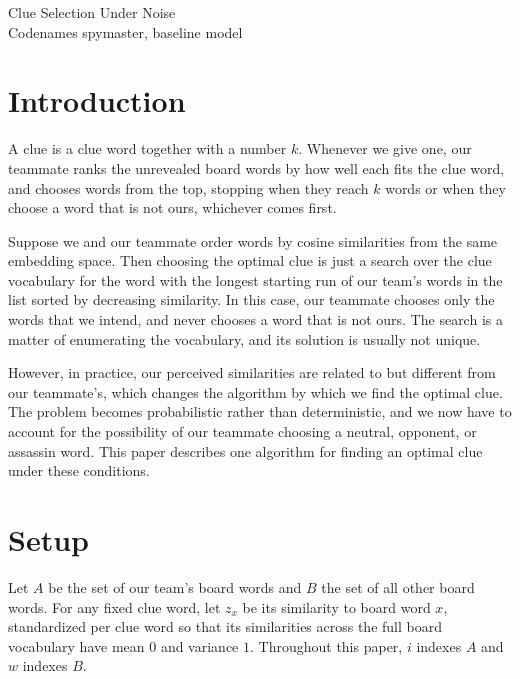 \documentclass[12pt]{article}
\begin{document}
\begin{center}
  {\LARGE Clue Selection Under Noise}\\[0.7em]
  Codenames spymaster, baseline model
\end{center}
\vspace{1.5em}

\section{Introduction}
\label{sec:intro}

A clue is a clue word together with a number $k$. Whenever we give one, our
teammate ranks the unrevealed board words by how well each fits the clue word,
and chooses words from the top, stopping when they reach $k$ words or when
they choose a word that is not ours, whichever comes first.

Suppose we and our teammate order words by cosine similarities from the same
embedding space. Then choosing the optimal clue is just a search over the clue
vocabulary for the word with the longest starting run of our team's words in
the list sorted by decreasing similarity. In this case, our teammate chooses
only the words that we intend, and never chooses a word that is not ours. The
search is a matter of enumerating the vocabulary, and its solution is usually
not unique.

However, in practice, our perceived similarities are related to but different
from our teammate's, which changes the algorithm by which we find the optimal
clue. The problem becomes probabilistic rather than deterministic, and we now
have to account for the possibility of our teammate choosing a neutral,
opponent, or assassin word. This paper describes one algorithm for finding an
optimal clue under these conditions. 

\section{Setup}
\label{sec:setup}

Let $A$ be the set of our team's board words and $B$ the set of all other board
words. For any fixed clue word, let $z_x$ be its similarity to board word $x$,
standardized per clue word so that its similarities across the full board
vocabulary have mean $0$ and variance $1$.
Throughout this paper, $i$ indexes $A$ and $w$ indexes $B$.
\end{document}
